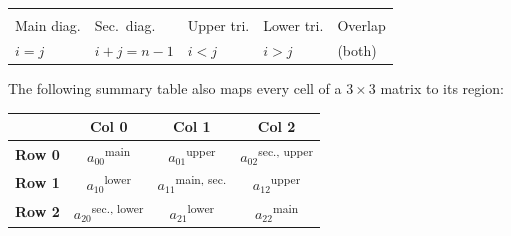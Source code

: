 \medskip

\begin{center}
\renewcommand{\arraystretch}{1.2}
\begin{tabular}{@{} >{\centering\arraybackslash}p{1.8cm}
                    >{\centering\arraybackslash}p{1.8cm}
                    >{\centering\arraybackslash}p{1.8cm}
                    >{\centering\arraybackslash}p{1.8cm}
                    >{\centering\arraybackslash}p{1.8cm} @{}}
\toprule
\colorbox{blue!25}{\strut\hspace{8mm}} &
\colorbox{orange!35}{\strut\hspace{8mm}} &
\colorbox{green!20}{\strut\hspace{8mm}} &
\colorbox{red!18}{\strut\hspace{8mm}} &
\colorbox{violet!25}{\strut\hspace{8mm}} \\
\footnotesize Main diag. &
\footnotesize Sec.\ diag. &
\footnotesize Upper tri. &
\footnotesize Lower tri. &
\footnotesize Overlap \\
\footnotesize $i = j$ &
\footnotesize $i{+}j = n{-}1$ &
\footnotesize $i < j$ &
\footnotesize $i > j$ &
\footnotesize (both) \\
\bottomrule
\end{tabular}
\end{center}

\medskip

The following summary table also maps every cell of a $3\times 3$ matrix
to its region:

\begin{center}
\renewcommand{\arraystretch}{1.3}
\begin{tabular}{@{} c ccc @{}}
\toprule
    & \textbf{Col 0} & \textbf{Col 1} & \textbf{Col 2} \\
\midrule
\textbf{Row 0}
    & $a_{00}$\;\textsuperscript{main}
    & $a_{01}$\;\textsuperscript{upper}
    & $a_{02}$\;\textsuperscript{sec., upper} \\
\textbf{Row 1}
    & $a_{10}$\;\textsuperscript{lower}
    & $a_{11}$\;\textsuperscript{main, sec.}
    & $a_{12}$\;\textsuperscript{upper} \\
\textbf{Row 2}
    & $a_{20}$\;\textsuperscript{sec., lower}
    & $a_{21}$\;\textsuperscript{lower}
    & $a_{22}$\;\textsuperscript{main} \\
\bottomrule
\end{tabular}
\end{center}


